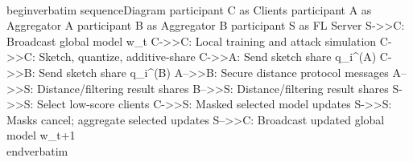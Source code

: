 \\begin{verbatim}
sequenceDiagram
    participant C as Clients
    participant A as Aggregator A
    participant B as Aggregator B
    participant S as FL Server
    S->>C: Broadcast global model w_t
    C->>C: Local training and attack simulation
    C->>C: Sketch, quantize, additive-share
    C->>A: Send sketch share q_i^(A)
    C->>B: Send sketch share q_i^(B)
    A-->>B: Secure distance protocol messages
    A-->>S: Distance/filtering result shares
    B-->>S: Distance/filtering result shares
    S->>S: Select low-score clients
    C->>S: Masked selected model updates
    S->>S: Masks cancel; aggregate selected updates
    S-->>C: Broadcast updated global model w_{t+1}
\\end{verbatim}
